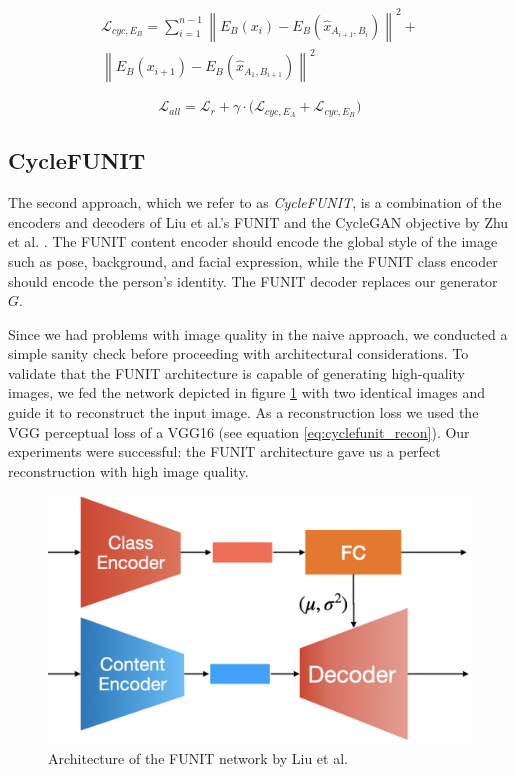 \documentclass[conference]{IEEEtran}
\begin{document}
\begin{equation}
\begin{split}
\mathcal{L}_{cyc, E_B} = \sum_{i=1}^{n-1} 
\left\| E_B(x_i) - E_B(\hat{x}_{A_{i+1},B_i}) \right\|^2 + \\
\left\| E_B(x_{i+1}) - E_B(\hat{x}_{A_1,B_{i+1}}) \right\|^2
\end{split}
\label{eq:naive_cycle_b}
\end{equation}

\begin{equation}
	\mathcal{L}_{all} = \mathcal{L}_r + \gamma \cdot \big( \mathcal{L}_{cyc, E_A} + \mathcal{L}_{cyc, E_B} \big)
	\label{eq:naive_all}
\end{equation}

\subsection{CycleFUNIT}
The second approach, which we refer to as \textit{CycleFUNIT}, is a combination of the encoders and decoders of Liu et al.'s FUNIT \cite{liu2019few} and the CycleGAN objective by Zhu et al. \cite{zhu2017unpaired}. The FUNIT content encoder should encode the global style of the image such as pose, background, and facial expression, while the FUNIT class encoder should encode the person's identity. The FUNIT decoder replaces our generator $G$. 

Since we had problems with image quality in the naive approach, we conducted a simple sanity check before proceeding with architectural considerations. To validate that the FUNIT architecture is capable of generating high-quality images, we fed the network depicted in figure \ref{fig:funit_block} with two identical images and guide it to reconstruct the input image. As a reconstruction loss we used the VGG perceptual loss of a VGG16 \cite{johnson2016perceptual} (see equation \ref{eq:cyclefunit_recon}). Our experiments were successful: the FUNIT architecture gave us a perfect reconstruction with high image quality.

\begin{figure}[h!]
	\centering
	\includegraphics[width=0.7\linewidth]{figures/FUNIT_block.png}
	\caption{Architecture of the FUNIT network by Liu et al. \cite{liu2019few}}
	\label{fig:funit_block}
\end{figure}
\end{document}
